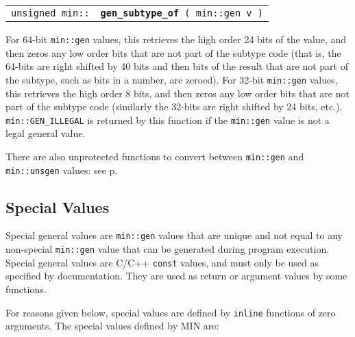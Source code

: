 \documentclass[12pt]{article}
\makeatletter
\newcommand{\ttindex}[1]{\index{#1@{\tt #1}}}
\newcommand{\minindex}[1]{\ttindex{min::#1}\ttindex{#1}}
\newcommand{\pagref}[1]{p\pageref{#1}}
\newcommand{\EOL}{\penalty \exhyphenpenalty}
\newenvironment{indpar}[1][0.3in]%
	{\begin{list}{}%
		     {\setlength{\itemsep}{0in}%
		      \setlength{\topsep}{0in}%
		      \setlength{\parsep}{1ex}%
		      \setlength{\labelwidth}{#1}%
		      \setlength{\leftmargin}{#1}%
		      \addtolength{\leftmargin}{\labelsep}}%
	 \item}%
	{\end{list}}
\newcommand{\LABEL}[1]{\label{#1}}
\newcommand{\MINKEY}[1]{{\tt \bf #1}\minindex{#1}}
\makeatother
\begin{document}
\begin{indpar}\begin{tabular}{r@{}l}
\verb|unsigned min::| & \MINKEY{gen\_subtype\_of}\verb| ( min::gen v )|
\LABEL{MIN::GEN_SUBTYPE_OF} \\
\end{tabular}\end{indpar}

For 64-bit \verb|min::gen| values, this retrieves the high order
24 bits of the value, and then zeros any low order bits that are not
part of the subtype code (that is, the 64-bits are right shifted by
40 bits and then bits of the result that are not part of the
subtype, such as bits in a number, are zeroed).
For 32-bit \verb|min::gen| values, this retrieves
the high order 8 bits, and then zeros any low order bits that are not
part of the subtype code (similarly the 32-bits are right shifted by
24 bits, etc.).
\verb|min::GEN_ILLEGAL| is returned by this function if the \verb|min::gen|
value is not a legal general value.

There are also unprotected functions to convert between
{\tt min::\EOL gen} and {\tt min::\EOL unsgen} values:
see \pagref{MUP::NEW_GEN}.

\subsection{Special Values}
\label{SPECIAL-VALUES}

Special general values are \verb|min::gen| values that are unique
and not equal to any non-special {\tt min::\EOL gen}
value that can be generated during
program execution.  Special general values are C/C++ {\tt const}
values, and must only be used as specified by documentation.
They are used as return or argument values by some functions.

For reasons given below, special values are defined by {\tt inline}
functions of zero arguments.
The special values defined by MIN are:
\end{document}
